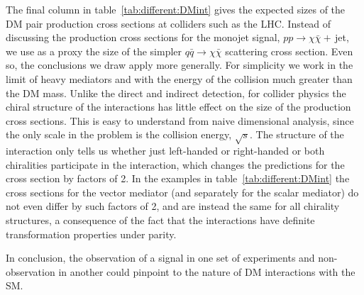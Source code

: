 \smallskip

The final column in table~\ref{tab:different:DMint} gives the expected sizes of the DM pair production cross sections at colliders such as the LHC. Instead of discussing the production cross sections for the monojet signal, 
$pp\to \chi \bar \chi +\,$jet, we use as a proxy the size of the simpler $q\bar q\to \chi \bar \chi$ scattering cross section. Even so, the conclusions we draw apply more generally. For simplicity we work in the limit of heavy mediators and with the energy of the collision much greater than the DM mass. Unlike the direct and indirect detection, for collider physics the chiral structure of the interactions has little effect on the size of the production cross sections. This is easy to understand from naive dimensional analysis, since the only scale in the problem is  the collision energy, $\sqrt s$. The structure of the interaction only tells us whether just left-handed or right-handed or both chiralities participate in the interaction, which changes the predictions for the cross section by factors of 2. In the examples in table~\ref{tab:different:DMint} the cross sections for the vector mediator (and separately for the scalar mediator) do not even differ by such factors of 2, and are instead the same for all chirality structures, a consequence of the fact that  the interactions have definite transformation properties under parity.

\smallskip

In conclusion, the observation of a signal in one set of experiments and non-observation in another could pinpoint  to the nature of DM interactions with the SM. 


